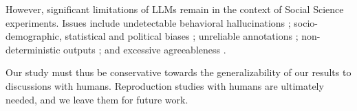 However, significant limitations of \acp{LLM} remain in the context of Social Science experiments. Issues include undetectable behavioral hallucinations \cite{rossi_2024}; socio-demographic, statistical and political biases \cite{anthis_2025,hewitt2024predicting,rossi_2024, Taubenfeld2024SystematicBI}; unreliable annotations \cite{jansen_2023,bisbee_2023,neumann_2025, Gligoric2024CanUL}; non-deterministic outputs \cite{atil_2025, bisbee_2023}; and excessive agreeableness \cite{Park2023GenerativeAI, anthis_2025, rossi_2024}.

Our study must thus be conservative towards the generalizability of our results to discussions with humans. Reproduction studies with humans are ultimately needed, and we leave them for future work.
